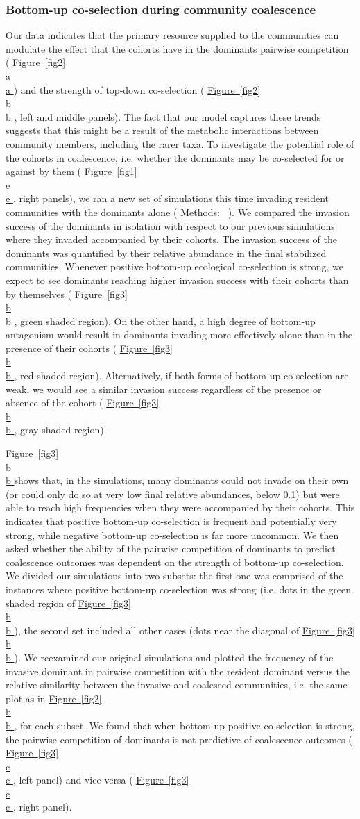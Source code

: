 \documentclass[a4paper,10pt]{article}
\newcommand{\figref}[2][]{%
  \hyperref[{#2}]{%
    Figure~\ref*{#2}%
    \ifx\\#1\\%
    \else
      #1%
    \fi
  }%
}
\newcommand{\methodsref}[1]{%
  \hyperref[{methods:#1}]{%
   Methods:~\nameref*{methods:#1}%
  }%
}
\begin{document}
\subsubsection*{Bottom-up co-selection during community coalescence}

Our data indicates that the primary resource supplied to the communities can modulate
the effect that the cohorts have in the dominants pairwise competition
(\figref[a]{fig2})
and the strength of top-down co-selection
(\figref[b]{fig2}, left and middle panels).
The fact that
our model captures these trends
suggests that this might be a result of the metabolic interactions
between community members, including the rarer taxa.
To investigate the potential role of the cohorts in coalescence,
 i.e. whether the dominants may be co-selected for or against by them
(\figref[e]{fig1}, right panels),
we ran a new set of simulations
this time invading resident communities with the dominants alone
(\methodsref{sim}).
We compared the invasion success of the dominants in isolation with respect to our previous
simulations where they invaded accompanied by their cohorts.
The invasion success of the dominants was quantified by their relative abundance
in the final stabilized communities.
Whenever positive bottom-up ecological co-selection is strong, we expect to see dominants
reaching higher invasion success with their cohorts than by themselves
(\figref[b]{fig3}, green shaded region).
On the other hand, a high degree of bottom-up antagonism would result in dominants
invading more effectively alone than in the presence of their cohorts
(\figref[b]{fig3}, red shaded region).
Alternatively, if both forms of bottom-up co-selection are weak, we would see a similar invasion success
regardless of the presence or absence of the cohort
(\figref[b]{fig3}, gray shaded region).

\figref[b]{fig3} shows that, in the simulations,
many dominants could not invade on their own
(or could only do so at very low final relative abundances, below 0.1)
but were able to reach high frequencies when they were accompanied by their cohorts.
This indicates that positive bottom-up co-selection is frequent and potentially very strong,
while negative bottom-up co-selection is far more uncommon.
We then asked whether the ability of the pairwise competition of dominants
to predict coalescence outcomes was dependent on the strength of bottom-up co-selection.
We divided our simulations into two subsets:
the first one was comprised of the instances where positive bottom-up co-selection was strong
(i.e. dots in the green shaded region of \figref[b]{fig3}),
the second set included all other cases
(dots near the diagonal of \figref[b]{fig3}).
We reexamined our original simulations and plotted the frequency of the invasive dominant
in pairwise competition with the resident dominant versus the relative similarity between
the invasive and coalesced communities,
i.e. the same plot as in \figref[b]{fig2}, for each subset.
We found that when bottom-up positive co-selection is strong,
the pairwise competition of dominants is not predictive of coalescence outcomes
(\figref[c]{fig3}, left panel) and vice-versa (\figref[c]{fig3}, right panel).
\end{document}
